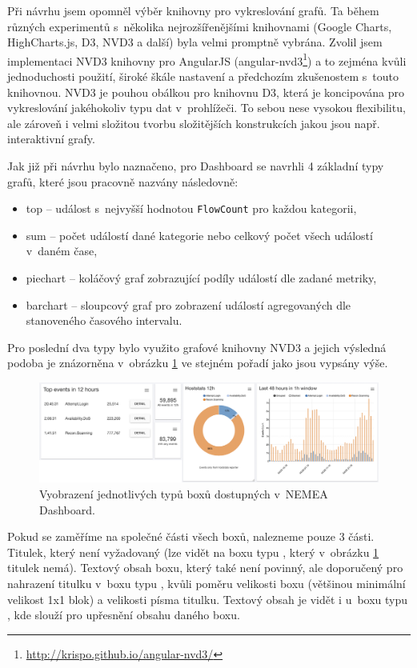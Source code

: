 Při návrhu jsem opomněl výběr knihovny pro vykreslování grafů. Ta během různých experimentů s~několika nejrozšířenějšími knihovnami (Google Charts, HighCharts.js, D3, NVD3 a další) byla velmi promptně vybrána. Zvolil jsem implementaci NVD3 knihovny pro AngularJS (angular-nvd3\footnote{\url{http://krispo.github.io/angular-nvd3/}}) a to zejména kvůli jednoduchosti použití, široké škále nastavení a předchozím zkušenostem s~touto knihovnou. NVD3 je pouhou obálkou pro knihovnu D3, která je koncipována pro vykreslování jakéhokoliv typu dat v~prohlížeči. To sebou nese vysokou flexibilitu, ale zároveň i velmi složitou tvorbu složitějších konstrukcích jakou jsou např. interaktivní grafy.

Jak již při návrhu bylo naznačeno, pro Dashboard se navrhli 4 základní typy grafů, které jsou pracovně nazvány následovně:

\begin{itemize}
    \item top -- událost s~nejvyšší hodnotou \texttt{FlowCount} pro každou kategorii,
    \item sum -- počet událostí dané kategorie nebo celkový počet všech událostí v~daném čase,
    \item piechart -- koláčový graf zobrazující podíly událostí dle zadané metriky,
    \item barchart -- sloupcový graf pro zobrazení událostí agregovaných dle stanoveného časového intervalu.
\end{itemize}

Pro poslední dva typy bylo využito grafové knihovny NVD3 a jejich výsledná podoba je znázorněna v~obrázku \ref{fig:boxes} ve stejném pořadí jako jsou vypsány výše.

\begin{figure}[ht]
    \centering
    \includegraphics[width=\textwidth]{fig/boxes.png}
    \caption{Vyobrazení jednotlivých typů boxů dostupných v~NEMEA Dashboard.} \label{fig:boxes}
\end{figure}

Pokud se zaměříme na společné části všech boxů, nalezneme pouze 3 části. Titulek, který není vyžadovaný (lze vidět na boxu typu , který v~obrázku \ref{fig:boxes} titulek nemá). Textový obsah boxu, který také není povinný, ale doporučený pro nahrazení titulku v~boxu typu , kvůli poměru velikosti boxu (většinou minimální velikost 1x1 blok) a velikosti písma titulku. Textový obsah je vidět i u~boxu typu , kde slouží pro upřesnění obsahu daného boxu.

